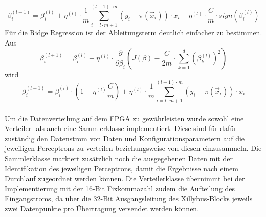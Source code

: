 \begin{displaymath}
\beta_i^{(l+1)} = \beta_i^{(l)} + \eta^{(l)} \cdot \frac{1}{m} \sum_{i=l\cdot m + 1}^{(l+1) \cdot m} (y_i-\pi(\vec x_i)) \cdot x_i -\eta^{(l)}\cdot \frac{C}{m} \cdot sign(\beta_i^{(l)})
\end{displaymath}
Für die Ridge Regression ist der Ableitungsterm deutlich einfacher zu bestimmen. Aus 
\begin{displaymath}
\beta_i^{(l+1)}=\beta_i^{(l)}+\eta^{(l)} \cdot \dfrac{\partial}{\partial \beta_i} \left( J(\beta)-\frac{C}{2m} \cdot \sum_{k=1}^d (\beta_k^{(l)})^2 \right)
\end{displaymath} wird \cite{HER2}
\begin{displaymath}
\beta_i^{(l+1)} = \beta_i^{(l)} \cdot \left(1-\eta^{(l)}\frac{C}{m}\right) + \eta^{(l)} \cdot \frac{1}{m} \sum_{i=l\cdot m + 1}^{(l+1) \cdot m} (y_i-\pi(\vec x_i)) \cdot x_i
\end{displaymath}\\
Um die Datenverteilung auf dem FPGA zu gewährleisten wurde sowohl eine Verteiler- als auch eine Sammlerklasse implementiert. Diese sind für dafür zuständig den Datenstrom von Daten und Konfigurationsparametern auf die jeweiligen Perceptrons zu verteilen beziehungsweise von diesen einzusammeln. Die Sammlerklasse markiert zusätzlich noch die ausgegebenen Daten mit der Identifikation des jeweiligen Perceptrons, damit die Ergebnisse nach einem Durchlauf zugeordnet werden können.
Die Verteilerklasse übernimmt bei der Implementierung mit der 16-Bit Fixkommazahl zudem die Aufteilung des Eingangstroms, da über die 32-Bit Ausgangsleitung des Xillybus-Blocks jeweils zwei Datenpunkte pro Übertragung versendet werden können.
